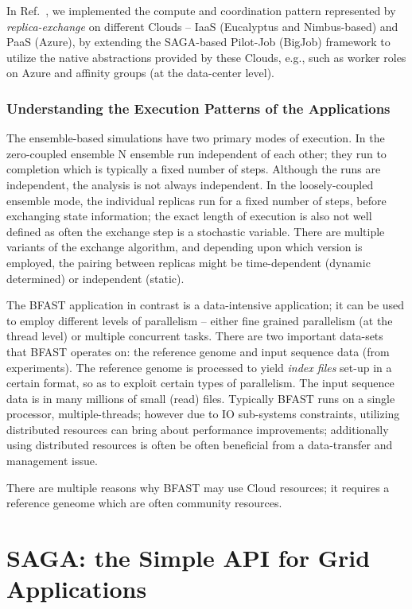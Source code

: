 \documentclass[10pt,conference,final,letterpaper,twoside,twocolumn,]{IEEEtran}
\newcommand{\I}[1]{\textit{#1}}
\begin{document}
 In Ref.~\cite{ccgrid10, cloudcom10}, we implemented the compute
 and coordination pattern represented by \I{replica-exchange} on
 different Clouds -- IaaS (Eucalyptus and Nimbus-based) and PaaS
 (Azure), by extending the SAGA-based Pilot-Job (BigJob) framework to
 utilize the native abstractions provided by these Clouds, e.g., such
 as worker roles on Azure and affinity groups (at the data-center
 level).

\subsubsection*{Understanding the Execution Patterns of the
   Applications}

 The ensemble-based simulations have two primary modes of execution.
 In the zero-coupled ensemble N ensemble run independent of each
 other; they run to completion which is typically a fixed number of
 steps. Although the runs are independent, the analysis is not always
 independent. In the loosely-coupled ensemble mode, the individual
 replicas run for a fixed number of steps, before exchanging state
 information; the exact length of execution is also not well defined
 as often the exchange step is a stochastic variable.  There are
 multiple variants of the exchange algorithm, and depending upon which
 version is employed, the pairing between replicas might be
 time-dependent (dynamic determined) or independent (static).

 The BFAST application in contrast is a data-intensive application; it
 can be used to employ different levels of parallelism -- either fine
 grained parallelism (at the thread level) or multiple concurrent
 tasks.  There are two important data-sets that BFAST operates on: the
 reference genome and input sequence data (from experiments). The
 reference genome is processed to yield {\it index files} set-up in a
 certain format, so as to exploit certain types of parallelism. The
 input sequence data is in many millions of small (read) files.
 Typically BFAST runs on a single processor, multiple-threads; however
 due to IO sub-systems constraints, utilizing distributed resources
 can bring about performance improvements; additionally using
 distributed resources is often be often beneficial from a
 data-transfer and management issue.

 There are multiple reasons why BFAST may use Cloud resources; it
 requires a reference geneome which are often community resources.
 

\section{SAGA: the Simple API for Grid Applications}
\label{sec:saga}
\end{document}
